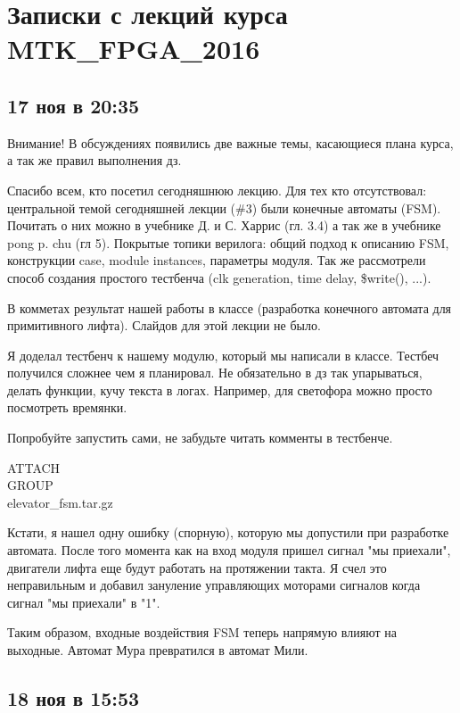 \documentclass[a4paper, 12pt]{extarticle}
\begin{document}
	\def \nocredits {}

\section{Записки с лекций курса MTK{\_}FPGA{\_}2016}


\subsection{17 ноя в 20:35}


Внимание! В обсуждениях появились две важные темы, касающиеся плана курса, а так же правил выполнения дз.

Спасибо всем, кто посетил сегодняшнюю лекцию. Для тех кто отсутствовал: центральной темой сегодняшней лекции (\#3) были конечные автоматы (FSM). Почитать о них можно в учебнике Д. и С. Харрис (гл. 3.4) а так же в учебнике pong p. chu (гл 5). Покрытые топики верилога: общий подход к описанию FSM, конструкции case, module instances, параметры модуля. Так же рассмотрели способ создания простого тестбенча (clk generation, time delay, \$write(), ...).

В комметах результат нашей работы в классе (разработка конечного автомата для примитивного лифта). Слайдов для этой лекции не было.

Я доделал тестбенч к нашему модулю, который мы написали в классе. Тестбеч получился сложнее чем я планировал. Не обязательно в дз так упарываться, делать функции, кучу текста в логах. Например, для светофора можно просто посмотреть времянки.

Попробуйте запустить сами, не забудьте читать комменты в тестбенче.

ATTACH\\GROUP\\elevator\_fsm.tar.gz

Кстати, я нашел одну ошибку (спорную), которую мы допустили при разработке автомата. После того момента как на вход модуля пришел сигнал "мы приехали", двигатели лифта еще будут работать на протяжении такта. Я счел это неправильным и добавил зануление управляющих моторами сигналов когда сигнал "мы приехали" в "1".

Таким образом, входные воздействия FSM теперь напрямую влияют на выходные. Автомат Мура превратился в автомат Мили.



\subsection{18 ноя в 15:53}
\end{document}
